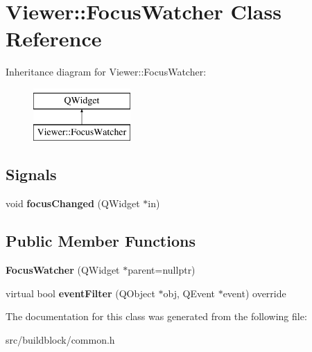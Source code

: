 \hypertarget{classViewer_1_1FocusWatcher}{}\section{Viewer\+:\+:Focus\+Watcher Class Reference}
\label{classViewer_1_1FocusWatcher}
Inheritance diagram for Viewer\+:\+:Focus\+Watcher\+:\begin{figure}[H]
\begin{center}
\leavevmode
\includegraphics[height=2.000000cm]{classViewer_1_1FocusWatcher}
\end{center}
\end{figure}
\subsection*{Signals}
\begin{DoxyCompactItemize}
\item 
\mbox{\label{classViewer_1_1FocusWatcher_a2356056a2eb6c4874bb1f3e30071da43}} 
void {\bfseries focus\+Changed} (Q\+Widget $\ast$in)
\end{DoxyCompactItemize}
\subsection*{Public Member Functions}
\begin{DoxyCompactItemize}
\item 
\mbox{\label{classViewer_1_1FocusWatcher_a06ba74372280ad5f82f7285faf8182c6}} 
{\bfseries Focus\+Watcher} (Q\+Widget $\ast$parent=nullptr)
\item 
\mbox{\label{classViewer_1_1FocusWatcher_a0a4b66d8af60049e668d0a0c317001c2}} 
virtual bool {\bfseries event\+Filter} (Q\+Object $\ast$obj, Q\+Event $\ast$event) override
\end{DoxyCompactItemize}


The documentation for this class was generated from the following file\+:\begin{DoxyCompactItemize}
\item 
src/buildblock/common.\+h\end{DoxyCompactItemize}
